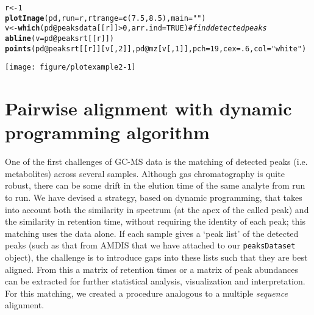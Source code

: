 \documentclass{article}\usepackage[]{graphicx}\usepackage[]{color}
\makeatletter
\def\maxwidth{ %
  \ifdim\Gin@nat@width>\linewidth
    \linewidth
  \else
    \Gin@nat@width
  \fi
}
\newcommand{\hlnum}[1]{\textcolor[rgb]{0.686,0.059,0.569}{#1}}%
\newcommand{\hlstr}[1]{\textcolor[rgb]{0.192,0.494,0.8}{#1}}%
\newcommand{\hlcom}[1]{\textcolor[rgb]{0.678,0.584,0.686}{\textit{#1}}}%
\newcommand{\hlopt}[1]{\textcolor[rgb]{0,0,0}{#1}}%
\newcommand{\hlstd}[1]{\textcolor[rgb]{0.345,0.345,0.345}{#1}}%
\newcommand{\hlkwb}[1]{\textcolor[rgb]{0.69,0.353,0.396}{#1}}%
\newcommand{\hlkwc}[1]{\textcolor[rgb]{0.333,0.667,0.333}{#1}}%
\newcommand{\hlkwd}[1]{\textcolor[rgb]{0.737,0.353,0.396}{\textbf{#1}}}%
\newenvironment{kframe}{%
 \def\at@end@of@kframe{}%
 \ifinner\ifhmode%
  \def\at@end@of@kframe{\end{minipage}}%
  \begin{minipage}{\columnwidth}%
 \fi\fi%
 \def\FrameCommand##1{\hskip\@totalleftmargin \hskip-\fboxsep
 \colorbox{shadecolor}{##1}\hskip-\fboxsep
     \hskip-\linewidth \hskip-\@totalleftmargin \hskip\columnwidth}%
 \MakeFramed {\advance\hsize-\width
   \@totalleftmargin\z@ \linewidth\hsize
   \@setminipage}}%
 {\par\unskip\endMakeFramed%
 \at@end@of@kframe}
\newenvironment{knitrout}{}{} %
\makeatother
\begin{document}
\begin{knitrout}
\color{fgcolor}\begin{kframe}
\begin{alltt}
\hlstd{r} \hlkwb{<-} \hlnum{1}
\hlkwd{plotImage}\hlstd{(pd,} \hlkwc{run}\hlstd{=r,} \hlkwc{rtrange}\hlstd{=}\hlkwd{c}\hlstd{(}\hlnum{7.5}\hlstd{,}\hlnum{8.5}\hlstd{),} \hlkwc{main}\hlstd{=}\hlstr{""}\hlstd{)}
\hlstd{v} \hlkwb{<-} \hlkwd{which}\hlstd{(pd}\hlopt{@}\hlkwc{peaksdata}\hlstd{[[r]]} \hlopt{>} \hlnum{0}\hlstd{,} \hlkwc{arr.ind}\hlstd{=}\hlnum{TRUE}\hlstd{)} \hlcom{# find detected peaks}
\hlkwd{abline}\hlstd{(}\hlkwc{v}\hlstd{=pd}\hlopt{@}\hlkwc{peaksrt}\hlstd{[[r]])}
\hlkwd{points}\hlstd{(pd}\hlopt{@}\hlkwc{peaksrt}\hlstd{[[r]][v[,}\hlnum{2}\hlstd{]], pd}\hlopt{@}\hlkwc{mz}\hlstd{[v[,}\hlnum{1}\hlstd{]],} \hlkwc{pch}\hlstd{=}\hlnum{19}\hlstd{,} \hlkwc{cex}\hlstd{=}\hlnum{.6}\hlstd{,} \hlkwc{col}\hlstd{=}\hlstr{"white"}\hlstd{)}
\end{alltt}
\end{kframe}
\texttt{[image: figure/plotexample2-1]} 
\end{knitrout}


\section{Pairwise alignment with dynamic programming algorithm}
One of the first challenges of GC-MS data is the matching of detected
peaks (i.e. metabolites) across several samples. Although gas
chromatography is quite robust, there can be some drift in the elution
time of the same analyte from run to run. We have devised a strategy,
based on dynamic programming, that takes into account both the
similarity in spectrum (at the apex of the called peak) and the
similarity in retention time, without requiring the identity of each
peak; this matching uses the data alone. If each sample gives a `peak
list' of the detected peaks (such as that from AMDIS that we have
attached to our \texttt{peaksDataset} object), the challenge is to
introduce gaps into these lists such that they are best aligned. From
this a matrix of retention times or a matrix of peak abundances can be
extracted for further statistical analysis, visualization and
interpretation. For this matching, we created a procedure analogous to
a multiple {\em sequence} alignment. 
\end{document}
